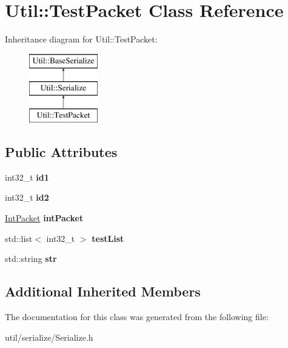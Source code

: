 \hypertarget{class_util_1_1_test_packet}{}\section{Util\+:\+:Test\+Packet Class Reference}
\label{class_util_1_1_test_packet}
Inheritance diagram for Util\+:\+:Test\+Packet\+:\begin{figure}[H]
\begin{center}
\leavevmode
\includegraphics[height=3.000000cm]{class_util_1_1_test_packet}
\end{center}
\end{figure}
\subsection*{Public Attributes}
\begin{DoxyCompactItemize}
\item 
\mbox{\label{class_util_1_1_test_packet_a560d8db6aef27b236679b3abc635fa5f}} 
int32\+\_\+t {\bfseries id1}
\item 
\mbox{\label{class_util_1_1_test_packet_a4097111f98402d732af46a9f0720b04a}} 
int32\+\_\+t {\bfseries id2}
\item 
\mbox{\label{class_util_1_1_test_packet_a3b85612effb996d70b095369ffb1eb5d}} 
\mbox{\hyperlink{class_util_1_1_int_packet}{Int\+Packet}} {\bfseries int\+Packet}
\item 
\mbox{\label{class_util_1_1_test_packet_adf457e557b0b0a1fa7135e684a712362}} 
std\+::list$<$ int32\+\_\+t $>$ {\bfseries test\+List}
\item 
\mbox{\label{class_util_1_1_test_packet_aef391cb770445ef1581ed8e418da89e0}} 
std\+::string {\bfseries str}
\end{DoxyCompactItemize}
\subsection*{Additional Inherited Members}


The documentation for this class was generated from the following file\+:\begin{DoxyCompactItemize}
\item 
util/serialize/Serialize.\+h\end{DoxyCompactItemize}
